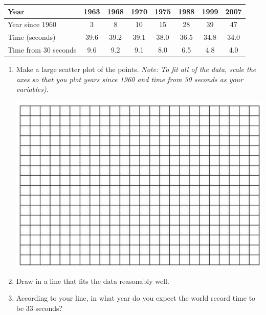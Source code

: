 \documentclass[12pt]{article}
\begin{document}
\begin{enumerate}
\begin{center}
\begin{tabular} {|l|c|c |c|c|c|c|c|}  \hline
Year & 1963 & 1968 & 1970 & 1975 & 1988 & 1999 & 2007  \\ \hline
Year since 1960 & 3 & 8 & 10 & 15 & 28 & 39 & 47  \\ \hline
Time (seconds) & 39.6 & 39.2 & 39.1 & 38.0 & 36.5 & 34.8 & 34.0  \\ \hline
Time from 30 seconds & 9.6 & 9.2 & 9.1 & 8.0 & 6.5 & 4.8 & 4.0  \\ \hline
\end{tabular}
\end{center}

\begin{enumerate}
\item Make a large scatter plot of the points. \emph{Note: To fit all of the data, scale the axes so that you plot years since 1960 and time from 30 seconds as your variables)}. 

\vspace{.1in}
\begin{center}
 {\includegraphics [width = 6in] {../graphPaper}}
\end{center}
\vspace{.1in}

\item Draw in a line that fits the data reasonably well.
\item  According to your line, in what year do you expect the world record time to be 33 seconds?
\end{enumerate}



\end{enumerate}
\end{document}

